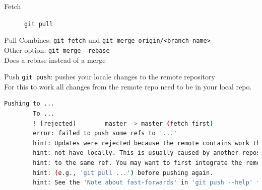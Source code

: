 \begin{frame}[allowframebreaks]{Fetch}
\begin{figure}
	\centering
	\caption{\texttt{git pull}}
\end{figure}

\end{frame}
\begin{frame}{Pull}
	Combines: \texttt{git fetch} und \texttt{git merge origin/<branch-name>}\\
	\vspace{1cm}
	Other option: \texttt{git merge --rebase}\\
	Does a rebase instead of a merge
\end{frame}
\begin{frame}[fragile]{Push}
	\texttt{git push}: pushes your locale changes to the remote repository\\
	\vspace{.5cm}
	For this to work all changes from the remote repo need to be in your local repo.
	\begin{lstlisting}[language=sh,basicstyle=\tiny]
		Pushing to ...
		To ...
		! [rejected]        master -> master (fetch first)
		error: failed to push some refs to '...'
		hint: Updates were rejected because the remote contains work that you do
		hint: not have locally. This is usually caused by another repository pushing
		hint: to the same ref. You may want to first integrate the remote changes
		hint: (e.g., 'git pull ...') before pushing again.
		hint: See the 'Note about fast-forwards' in 'git push --help' for details.
	\end{lstlisting}
\end{frame}
